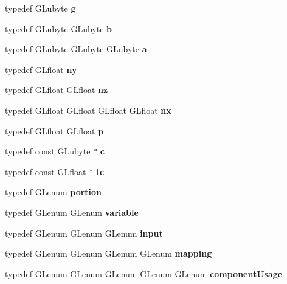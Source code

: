 \begin{DoxyCompactItemize}
\item 
typedef G\+Lubyte {\bfseries g}\label{_s_d_l__opengl_8h_acaceb3a655ff28b75259860bcb868f9f}

\item 
typedef G\+Lubyte G\+Lubyte {\bfseries b}\label{_s_d_l__opengl_8h_a0f71581a41fd2264c8944126dabbd010}

\item 
typedef G\+Lubyte G\+Lubyte G\+Lubyte {\bfseries a}\label{_s_d_l__opengl_8h_a3309789fc188587d666cda5ece79cf82}

\item 
typedef G\+Lfloat {\bfseries ny}\label{_s_d_l__opengl_8h_a5a459fddb3f3a7a2ee52f89967d9f501}

\item 
typedef G\+Lfloat G\+Lfloat {\bfseries nz}\label{_s_d_l__opengl_8h_a2999523991f24fec5d9f318db9701081}

\item 
typedef G\+Lfloat G\+Lfloat G\+Lfloat G\+Lfloat {\bfseries nx}\label{_s_d_l__opengl_8h_a7b63baa60e3c97412035037321a09313}

\item 
typedef G\+Lfloat G\+Lfloat {\bfseries p}\label{_s_d_l__opengl_8h_aa5367c14d90f462230c2611b81b41d23}

\item 
typedef const G\+Lubyte $\ast$ {\bfseries c}\label{_s_d_l__opengl_8h_a1f2d7f8147412c43ba2303a56f97ee73}

\item 
typedef const G\+Lfloat $\ast$ {\bfseries tc}\label{_s_d_l__opengl_8h_a45e774067520be559b8e78373132a9ec}

\item 
typedef G\+Lenum {\bfseries portion}\label{_s_d_l__opengl_8h_ac7573ca771f669e554cf6e3975ac7fcb}

\item 
typedef G\+Lenum G\+Lenum {\bfseries variable}\label{_s_d_l__opengl_8h_aac5473f0a0d0d38841ea8d37c5ca032d}

\item 
typedef G\+Lenum G\+Lenum G\+Lenum {\bfseries input}\label{_s_d_l__opengl_8h_ad3c78daa7d8673f71649d4840c641779}

\item 
typedef G\+Lenum G\+Lenum G\+Lenum G\+Lenum {\bfseries mapping}\label{_s_d_l__opengl_8h_aa4f194e5160ccbb5a8e83ab6ef4676d2}

\item 
typedef G\+Lenum G\+Lenum G\+Lenum G\+Lenum G\+Lenum {\bfseries component\+Usage}\label{_s_d_l__opengl_8h_ac91702bfd72ddae881fca64825724bc2}


\end{DoxyCompactItemize}
